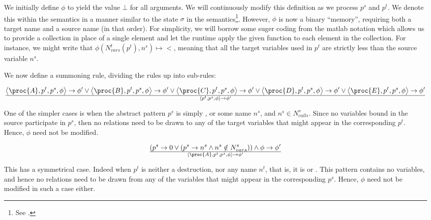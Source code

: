 We initially define $\phi$ to yield the value $\bot$ for all arguments. We will
continuously modify this definition as we process $p^s$ and $p^t$. We denote
this within the semantics in a manner similar to the state $\sigma$ in the
semantics\footnote{See .}. However, $\phi$ is now a
binary ``memory'', requiring both a target name and a source name (in that
order). For simplicity, we will borrow some suger coding from the matlab
notation which allows us to provide a collection in place of a single element
and let the runtime apply the given function to each element in the collection.
For instance, we might write that $\phi\left(N_{vars}^t(p^t), n^s\right)\mapsto
<$, meaning that all the target variables used in $p^t$ are strictly less than
the source variable $n^s$.

We now define a summoning rule, dividing the rules up into sub-rules:

\begin{equation}
{
    \left\langle\proc{A},p^t,p^s,\phi\right\rangle
    \rightarrow
    \phi'
  \vee
    \left\langle\proc{B},p^t,p^s,\phi\right\rangle
    \rightarrow
    \phi'
  \vee
    \left\langle\proc{C},p^t,p^s,\phi\right\rangle
    \rightarrow
    \phi'
  \vee
    \left\langle\proc{D},p^t,p^s,\phi\right\rangle
    \rightarrow
    \phi'
  \vee
    \left\langle\proc{E},p^t,p^s,\phi\right\rangle
    \rightarrow
    \phi'
}\over{
  \left\langle p^t,p^s,\phi\right\rangle
  \rightarrow
  \phi'
}
\end{equation}

One of the simpler cases is when the abstract pattern $p^s$ is simply ,
or some name $n^s$, and $n^s\in N_{calls}^s$. Since no variables bound in the
source participate in $p^s$, then no relations need to be drawn to any of the
target variables that might appear in the corresponding $p^t$. Hence, $\phi$
need not be modified.

\begin{equation}\label{eq:sct-pattern-source-fail}
{
\left(
    p^s\rightarrow 0
  \vee
\left(
    p^s\rightarrow n^s
  \wedge
    n^s\notin N_{vars}^s
\right)
\right)
  \wedge
    \phi\rightarrow\phi'
}\over{
  \left\langle\proc{A},p^t,p^s,\phi\right\rangle
  \rightarrow
  \phi'
}
\end{equation}

This has a symmetrical case. Indeed when $p^t$ is neither a destruction, nor
any name $n^t$, that is, it is \mono{\_} or . This pattern contains no
variables, and hence  no relations need to be drawn from any of the variables
that might appear in the corresponding $p^s$. Hence, $\phi$ need not be
modified in such a case either.


